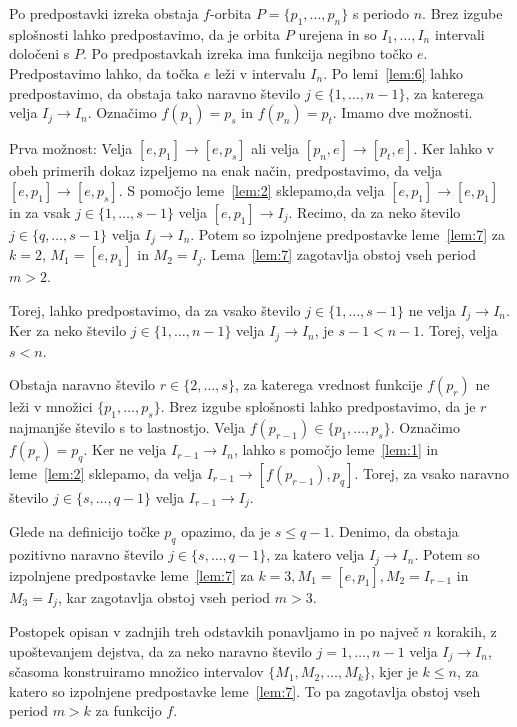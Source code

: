 \documentclass[../TG_magistrsko_delo_sections.tex]{subfiles}
\begin{document}
\begin{dokaz}
Po predpostavki izreka obstaja $f$-orbita $P = \{p_1, \dots, p_n\}$ s periodo $n$. Brez izgube splošnosti lahko predpostavimo, da je orbita $P$ urejena in so $I_1, \dots, I_n$ intervali določeni s $P$. Po predpostavkah izreka ima funkcija negibno točko $e$. Predpostavimo lahko, da točka $e$ leži v intervalu $I_n$. Po lemi~\ref{lem:6} lahko predpostavimo, da obstaja tako naravno število $j \in \{1, \dots, n-1\}$, za katerega velja $I_j \to I_n$.
Označimo $f(p_1) = p_s$ in $f(p_n) = p_t$. Imamo dve možnosti.

Prva možnost: 
Velja $[e, p_1] \to [e, p_s]$ ali velja $[p_n, e] \to [p_t, e]$. Ker lahko v obeh primerih dokaz izpeljemo na enak način, predpostavimo, da velja $[e, p_1] \to [e, p_s]$. S pomočjo leme~\ref{lem:2} sklepamo,da velja $[e, p_1] \to [e, p_1]$ in za vsak $j \in \{1, \dots, s-1\}$ velja $[e, p_1] \to I_j$.
Recimo, da za neko število $j \in \{q, \dots, s-1\}$ velja $I_j \to I_n$. Potem so izpolnjene predpostavke leme~\ref{lem:7} za $k=2$, $M_1=[e, p_1]$ in $M_2 = I_j$. Lema~\ref{lem:7} zagotavlja obstoj vseh period $m > 2$.

Torej, lahko predpostavimo, da za vsako število $j \in \{1, \dots, s-1\}$ ne velja $I_j \to I_n$. Ker za neko število $j \in \{1, \dots, n-1\}$ velja $I_j \to I_n$, je $s-1 < n-1$. Torej, velja $s < n$. 

Obstaja naravno število $r \in \{2, \dots, s\}$, za katerega vrednost funkcije $f(p_r)$ ne leži v množici $\{p_1, \dots, p_s \}$. %
Brez izgube splošnosti lahko predpostavimo, da je $r$ najmanjše število s to lastnostjo. Velja $f(p_{r-1}) \in \{p_1, \dots, p_s\}$. Označimo $f(p_r) = p_q$. Ker ne velja $I_{r-1} \to I_n$, lahko s pomočjo leme~\ref{lem:1} in leme~\ref{lem:2} sklepamo, da velja $I_{r-1} \to [f(p_{r-1}), p_q]$. Torej, za vsako naravno število $j \in \{s, \dots, q-1\}$ velja $I_{r-1} \to I_j$. 

Glede na definicijo točke $p_q$ opazimo, da je $s \leq q-1$. Denimo, da obstaja pozitivno naravno število $j \in \{s, \dots, q-1\}$, za katero velja $I_j \to I_n$. Potem so izpolnjene predpostavke leme~\ref{lem:7} za $k=3, M_1 = [e, p_1], M_2 = I_{r-1}$ in  $M_3 =I_j$, kar zagotavlja obstoj vseh period $m > 3$.

Postopek opisan v zadnjih treh odstavkih ponavljamo in po največ $n$ korakih, z upoštevanjem dejstva, da za neko naravno število $j = 1, \dots, n-1$ velja $I_j \to I_n$, sčasoma konstruiramo množico intervalov $\{M_1, M_2, \dots, M_k\}$, kjer je $k \leq n$, za katero so izpolnjene predpostavke leme~\ref{lem:7}. To pa zagotavlja obstoj vseh period $m > k$ za funkcijo $f$.


\end{dokaz}
\end{document}
